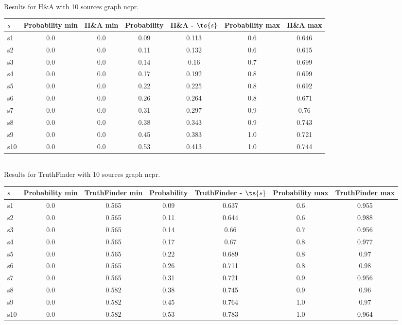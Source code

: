 \documentclass{article}
\begin{document}
\noindent Results for H\&A with 10 sources graph ncpr.

\noindent\begin{tabular}{|l|c|c|c|c|c|c|}
\hline
$s$& Probability min & H\&A min & Probability & H\&A - $\ts{s}$ & Probability max & H\&A max\\
\hline
s1 &0.0 & 0.0 & 0.09 & 0.113 & 0.6 & 0.646\\
\hline
s2 &0.0 & 0.0 & 0.11 & 0.132 & 0.6 & 0.615\\
\hline
s3 &0.0 & 0.0 & 0.14 & 0.16 & 0.7 & 0.699\\
\hline
s4 &0.0 & 0.0 & 0.17 & 0.192 & 0.8 & 0.699\\
\hline
s5 &0.0 & 0.0 & 0.22 & 0.225 & 0.8 & 0.692\\
\hline
s6 &0.0 & 0.0 & 0.26 & 0.264 & 0.8 & 0.671\\
\hline
s7 &0.0 & 0.0 & 0.31 & 0.297 & 0.9 & 0.76\\
\hline
s8 &0.0 & 0.0 & 0.38 & 0.343 & 0.9 & 0.743\\
\hline
s9 &0.0 & 0.0 & 0.45 & 0.383 & 1.0 & 0.721\\
\hline
s10 &0.0 & 0.0 & 0.53 & 0.413 & 1.0 & 0.744\\
\hline
\end{tabular}\\

\noindent Results for TruthFinder with 10 sources graph ncpr.

\noindent\begin{tabular}{|l|c|c|c|c|c|c|}
\hline
$s$& Probability min & TruthFinder min & Probability & TruthFinder - $\ts{s}$ & Probability max & TruthFinder max\\
\hline
s1 &0.0 & 0.565 & 0.09 & 0.637 & 0.6 & 0.955\\
\hline
s2 &0.0 & 0.565 & 0.11 & 0.644 & 0.6 & 0.988\\
\hline
s3 &0.0 & 0.565 & 0.14 & 0.66 & 0.7 & 0.956\\
\hline
s4 &0.0 & 0.565 & 0.17 & 0.67 & 0.8 & 0.977\\
\hline
s5 &0.0 & 0.565 & 0.22 & 0.689 & 0.8 & 0.97\\
\hline
s6 &0.0 & 0.565 & 0.26 & 0.711 & 0.8 & 0.98\\
\hline
s7 &0.0 & 0.565 & 0.31 & 0.721 & 0.9 & 0.956\\
\hline
s8 &0.0 & 0.582 & 0.38 & 0.745 & 0.9 & 0.96\\
\hline
s9 &0.0 & 0.582 & 0.45 & 0.764 & 1.0 & 0.97\\
\hline
s10 &0.0 & 0.582 & 0.53 & 0.783 & 1.0 & 0.964\\
\hline
\end{tabular}\\
\end{document}
